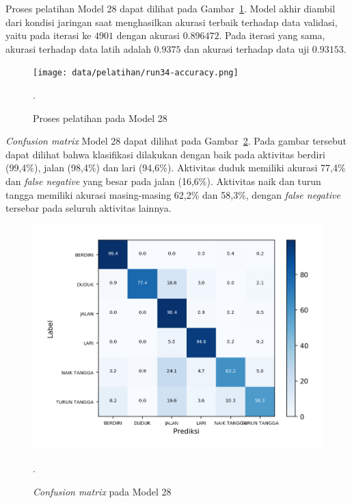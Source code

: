 Proses pelatihan Model 28 dapat dilihat pada Gambar~\ref{gambar:run34-training}. Model akhir diambil dari kondisi jaringan saat menghasilkan akurasi terbaik terhadap data validasi, yaitu pada iterasi ke $4901$ dengan akurasi $0.896472$. Pada iterasi yang sama, akurasi terhadap data latih adalah $0.9375$ dan akurasi terhadap data uji  $0.93153$.

\begin{figure}[h!]
    \centering
    \texttt{[image: data/pelatihan/run34-accuracy.png]}
    \caption{Proses pelatihan pada Model 28}.
    \label{gambar:run34-training}
\end{figure}

\textit{Confusion matrix} Model 28 dapat dilihat pada Gambar~\ref{gambar:run34-confusion-martix}. Pada gambar tersebut dapat dilihat bahwa klasifikasi dilakukan dengan baik pada aktivitas berdiri (99,4\%), jalan (98,4\%) dan lari (94,6\%). Aktivitas duduk memiliki akurasi 77,4\% dan \textit{false negative} yang besar pada jalan (16,6\%). Aktivitas naik dan turun tangga memiliki akurasi masing-masing 62,2\% dan 58,3\%, dengan \textit{false negative} tersebar pada seluruh aktivitas lainnya.

\begin{figure}[h!]
    \centering
    \includegraphics[width=13cm]{gambar/hasil-pembahasan/run34-confusion-matrix.png}
    \caption{\textit{Confusion matrix} pada Model 28}.
    \label{gambar:run34-confusion-martix}
\end{figure}

